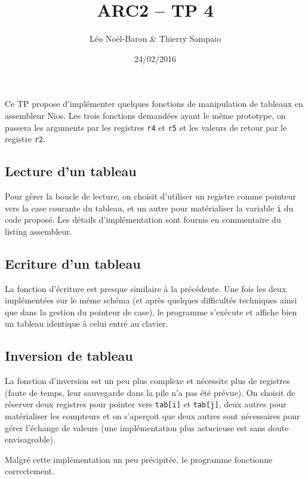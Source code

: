 \documentclass[a4paper,11pt]{article}
\title{ARC2 -- TP 4}
\author{Léo Noël-Baron \& Thierry Sampaio}
\date{24/02/2016}
\begin{document}
\maketitle

Ce TP propose d'implémenter quelques fonctions de manipulation de tableaux en assembleur Nios. Les trois fonctions demandées ayant le même prototype, on passera les arguments par les registres \verb?r4? et \verb?r5? et les valeurs de retour par le registre \verb?r2?.

\subsection*{Lecture d'un tableau}

Pour gérer la boucle de lecture, on choisit d'utiliser un registre comme pointeur vers la case courante du tableau, et un autre pour matérialiser la variable \verb?i? du code proposé. Les détails d'implémentation sont fournis en commentaire du listing assembleur.

\subsection*{Ecriture d'un tableau}

La fonction d'écriture est presque similaire à la précédente. Une fois les deux implémentées sur le même schéma (et après quelques difficultés techniques ainsi que dans la gestion du pointeur de case), le programme s'exécute et affiche bien un tableau identique à celui entré au clavier.

\subsection*{Inversion de tableau}

La fonction d'inversion est un peu plus complexe et nécessite plus de registres (faute de temps, leur sauvegarde dans la pile n'a pas été prévue). On choisit de réserver deux registres pour pointer vers \verb?tab[i]? et \verb?tab[j]?, deux autres pour matérialiser les compteurs et on s'aperçoit que deux autres sont nécessaires pour gérer l'échange de valeurs (une implémentation plus astucieuse est sans doute envisageable).

Malgré cette implémentation un peu précipitée, le programme fonctionne correctement.
\end{document}
